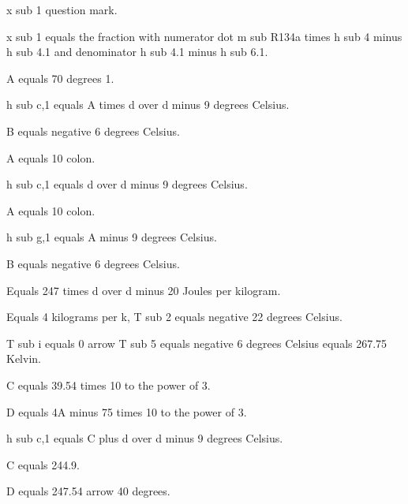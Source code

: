 x sub 1 question mark.

x sub 1 equals the fraction with numerator dot m sub R134a times h sub 4 minus h sub 4.1 and denominator h sub 4.1 minus h sub 6.1.

A equals 70 degrees 1.

h sub c,1 equals A times d over d minus 9 degrees Celsius.

B equals negative 6 degrees Celsius.

A equals 10 colon.

h sub c,1 equals d over d minus 9 degrees Celsius.

A equals 10 colon.

h sub g,1 equals A minus 9 degrees Celsius.

B equals negative 6 degrees Celsius.

Equals 247 times d over d minus 20 Joules per kilogram.

Equals 4 kilograms per k, T sub 2 equals negative 22 degrees Celsius.

T sub i equals 0 arrow T sub 5 equals negative 6 degrees Celsius equals 267.75 Kelvin.

C equals 39.54 times 10 to the power of 3.

D equals 4A minus 75 times 10 to the power of 3.

h sub c,1 equals C plus d over d minus 9 degrees Celsius.

C equals 244.9.

D equals 247.54 arrow 40 degrees.